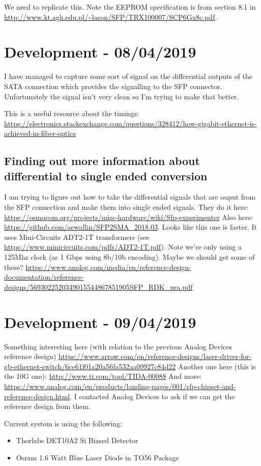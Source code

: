We need to replicate this. Note the EEPROM specification is from section 8.1
in \url{http://www.kt.agh.edu.pl/~lason/SFP/TRX100007/SCP6Gx8c.pdf}.

\section{Development - 08/04/2019}
I have managed to capture some sort of signal on the differential outputs
of the SATA connection which provides the signalling to the \ac{SFP} connector.
Unfortunately the signal isn't very clean so I'm trying to make that better.

This is a useful resource about the timings:
\url{https://electronics.stackexchange.com/questions/328412/how-gigabit-ethernet-is-achieved-in-fiber-optics}

\subsection{Finding out more information about differential to single ended
conversion}
I am trying to figure out how to take the differential signals that are ouput
from the SFP connection and make them into single ended signals.
They do it here: \url{https://osmocom.org/projects/misc-hardware/wiki/Sfp-experimenter}
Also here: \url{https://github.com/aewallin/SFP2SMA_2018.03}. Looks like this
one is faster. It uses Mini-Circuits ADT2-1T transformers (see \url{https://www.minicircuits.com/pdfs/ADT2-1T.pdf}).
Note we're only using a 125Mhz clock (as 1 Gbps using 8b/10b encoding).
Maybe we should get some of these? \url{https://www.analog.com/media/en/reference-design-documentation/reference-designs/5693022520349015544867851905SFP_RDK_pra.pdf}

\section{Development - 09/04/2019}

Something interesting here (with relation to the previous Analog Devices
reference design)
\url{https://www.arrow.com/en/reference-designs/laser-driver-for-gb-ethernet-switch/6ce61f01a20a56fa532aa09927c84d22}
Another one here (this is the 10G one): \url{http://www.ti.com/tool/TIDA-00088}
And more: \url{https://www.analog.com/en/products/landing-pages/001/sfp-chipset-and-reference-design.html}.
I contacted Analog Devices to ask if we can get the reference design from them.

Current system is using the following:
\begin{itemize}
\item{Thorlabs DET10A2 Si Biased Detector}
\item{Osram 1.6 Watt Blue Laser Diode in TO56 Package}
\end{itemize}

